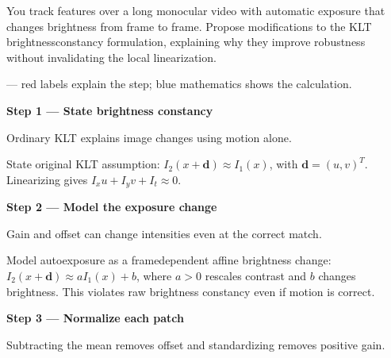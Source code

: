 \documentclass[letterpaper,11pt,english,openany,oneside]{jupyterBook}
\begin{document}
\sphinxAtStartPar
You track features over a long monocular video with automatic exposure that changes brightness from frame to frame. Propose modifications to the KLT brightness\sphinxhyphen{}constancy formulation, explaining why they improve robustness without invalidating the local linearization.

\par\medskip

\sphinxAtStartPar
{} — red labels explain the step; blue mathematics shows the calculation.

\par\medskip{}
{\color{QuizStepRed}\bfseries Step 1 — State brightness constancy}\par\smallskip

\sphinxAtStartPar
{} Ordinary KLT explains image changes using motion alone.

\sphinxAtStartPar
State original KLT assumption: {\color{QuizMathBlue} \(I_2(x+\mathbf d)\approx I_1(x)\)}, with {\color{QuizMathBlue} \(\mathbf d=(u,v)^T\)}. Linearizing gives {\color{QuizMathBlue} \(I_xu+I_yv+I_t\approx0\)}.

\par

\par\medskip{}
{\color{QuizStepRed}\bfseries Step 2 — Model the exposure change}\par\smallskip

\sphinxAtStartPar
{} Gain and offset can change intensities even at the correct match.

\sphinxAtStartPar
Model auto\sphinxhyphen{}exposure as a frame\sphinxhyphen{}dependent affine brightness change: {\color{QuizMathBlue} \(I_2(x+\mathbf d)\approx aI_1(x)+b\)}, where {\color{QuizMathBlue} \(a>0\)} rescales contrast and {\color{QuizMathBlue} \(b\)} changes brightness. This violates raw brightness constancy even if motion is correct.

\par

\par\medskip{}
{\color{QuizStepRed}\bfseries Step 3 — Normalize each patch}\par\smallskip

\sphinxAtStartPar
{} Subtracting the mean removes offset and standardizing removes positive gain.
\end{document}
